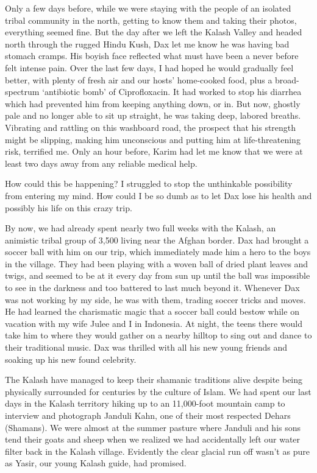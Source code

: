 \documentclass[12pt, titlepage]{article}
\begin{document}
{\begin{spacing}{1.15}
Only a few days before, while we were staying with the people of an isolated tribal community in the north, getting to know them and taking their photos, everything seemed fine. But the day after we left the Kalash Valley and headed north through the rugged Hindu Kush, Dax let me know he was having bad stomach cramps. His boyish face reflected what must have been a never before felt intense pain. Over the last few days, I had hoped he would gradually feel better, with plenty of fresh air and our hosts' home-cooked food, plus a broad-spectrum `antibiotic bomb' of Ciprofloxacin. It had worked to stop his diarrhea which had prevented him from keeping anything down, or in. But now, ghostly pale and no longer able to sit up straight, he was taking deep, labored breaths.  Vibrating and rattling on this washboard road, the prospect that his strength might be slipping, making him unconscious and putting him at life-threatening risk, terrified me. Only an hour before, Karim had let me know that we were at least two days away from any reliable medical help. 

How could this be happening?  I struggled to stop the unthinkable possibility from entering my mind.  How could I be so dumb as to let Dax lose his health and possibly his life on this crazy trip.
 
By now, we had already spent nearly two full weeks with the Kalash, an animistic tribal group of 3,500 living near the Afghan border.  Dax had brought a soccer ball with him on our trip, which immediately made him a hero to the boys in the village. They had been playing with a woven ball of dried plant leaves and twigs, and seemed to be at it every day from sun up until the ball was impossible to see in the darkness and too battered to last much beyond it. Whenever Dax was not working by my side, he was with them, trading soccer tricks and moves. He had learned the charismatic magic that a soccer ball could bestow while on vacation with my wife Julee and I in Indonesia. At night, the teens there would take him to where they would gather on a nearby hilltop to sing out and dance to their traditional music. Dax was thrilled with all his new young friends and soaking up his new found celebrity. 

The Kalash have managed to keep their shamanic traditions alive despite being physically surrounded for centuries by the culture of Islam.  We had spent our last days in the Kalash territory hiking up to an 11,000-foot mountain camp to interview and photograph Janduli Kahn, one of their most respected Dehars (Shamans).  We were almost at the summer pasture where Janduli and his sons tend their goats and sheep when we realized we had accidentally left our water filter back in the Kalash village.  Evidently the clear glacial run off wasn't as pure as Yasir, our young Kalash guide, had promised. 


\end{spacing}}
\end{document}
